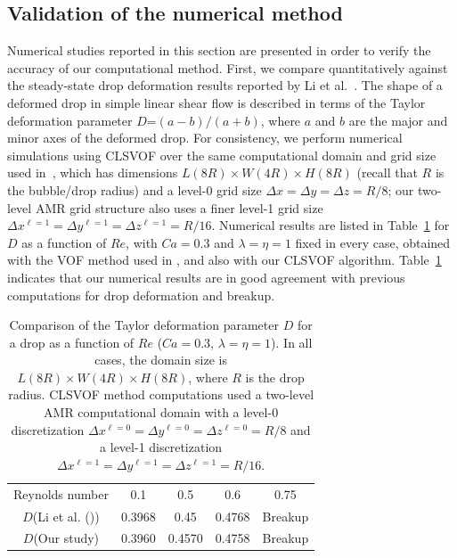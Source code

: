 \documentclass[%
 reprint,
 showkeys,
 amsmath,amssymb,
 aps,
 prfluids,
 onecolumn
]{revtex4-2}
\newcommand{\lwh}[3]{L(#1R)\times W(#2R) \times H(#3R)}
\begin{document}
\subsection{Validation of the numerical method}
Numerical studies reported in this section
are presented in order to verify the accuracy of our computational
method.  First, we compare quantitatively against the steady-state drop
deformation results reported by Li et al.~\cite{LiRenRen00}.  The shape of a
deformed drop in simple linear shear flow is described in terms of the Taylor
deformation parameter {\color{red} $D$}=$(a-b)/(a+b)$, 
where $a$ and $b$ are the major and
minor axes of the deformed drop.  For consistency, we perform numerical
simulations using CLSVOF over the same computational domain and grid size used
in~\cite{LiRenRen00}, which has dimensions $\lwh{8}{4}{8}$ (recall that $R$ is
the bubble/drop radius) and a level-0 grid size $\Delta x=\Delta y=\Delta
z=R/8$; our two-level AMR grid structure also uses a finer level-1 grid size
$\Delta x^{\ell=1} = \Delta y^{\ell=1} = \Delta z^{\ell=1} = R/16$.  Numerical
results are listed in Table~\ref{tab:DeComparison} for {\color{red} $D$} 
as a function of
$Re$, with $Ca=0.3$ and $\lambda = \eta = 1$ fixed in every case, obtained with
the VOF method used in \cite{LiRenRen00}, and also with our CLSVOF algorithm.
Table~\ref{tab:DeComparison} indicates that our numerical results are in good
agreement with previous computations for drop deformation and breakup.
%
\begin{table}[tbh]
\caption{Comparison of the Taylor deformation parameter {\color{red} $D$} 
for a drop as a function 
         of $Re$ ($Ca=0.3$, $\lambda = \eta = 1$). In all cases, the domain 
         size is $\lwh{8}{4}{8}$, where $R$ is the drop radius.
         CLSVOF method computations used a two-level AMR computational domain 
         with a level-0 discretization $\Delta x^{\ell=0} = \Delta y^{\ell=0} 
         = \Delta z^{\ell=0} = R/8$ and a level-1 discretization
         $\Delta x^{\ell=1} = \Delta y^{\ell=1} = \Delta z^{\ell=1} = R/16$.}
\label{tab:DeComparison}
\center
\begin{tabular}{ c  c  c  c  c }
\hline
\hline
Reynolds number                      & 0.1     & 0.5     & 0.6     & 0.75      \\
{\color{red} $D$}(Li et al. (\cite{LiRenRen00}))  & 0.3968  & 0.45    & 0.4768  & Breakup   \\
{\color{red} $D$}(Our study)                      & 0.3960  & 0.4570  & 0.4758  & Breakup   \\
\hline
\hline
\end{tabular}
\end{table}
\end{document}
